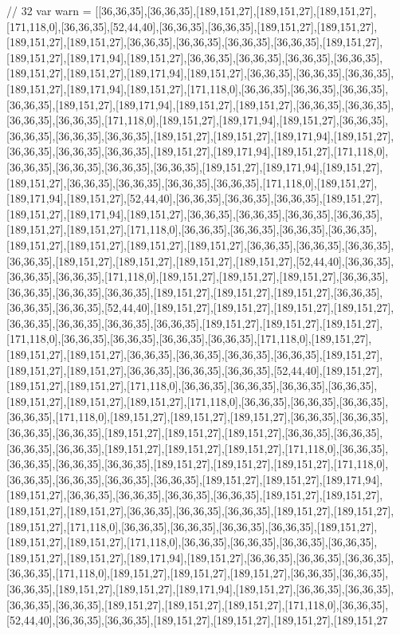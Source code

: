 // 32
var warn = [[36,36,35],[36,36,35],[189,151,27],[189,151,27],[189,151,27],[171,118,0],[36,36,35],[52,44,40],[36,36,35],[36,36,35],[189,151,27],[189,151,27],[189,151,27],[189,151,27],[36,36,35],[36,36,35],[36,36,35],[36,36,35],[189,151,27],[189,151,27],[189,171,94],[189,151,27],[36,36,35],[36,36,35],[36,36,35],[36,36,35],[189,151,27],[189,151,27],[189,171,94],[189,151,27],[36,36,35],[36,36,35],[36,36,35],[189,151,27],[189,171,94],[189,151,27],[171,118,0],[36,36,35],[36,36,35],[36,36,35],[36,36,35],[189,151,27],[189,171,94],[189,151,27],[189,151,27],[36,36,35],[36,36,35],[36,36,35],[36,36,35],[171,118,0],[189,151,27],[189,171,94],[189,151,27],[36,36,35],[36,36,35],[36,36,35],[36,36,35],[189,151,27],[189,151,27],[189,171,94],[189,151,27],[36,36,35],[36,36,35],[36,36,35],[189,151,27],[189,171,94],[189,151,27],[171,118,0],[36,36,35],[36,36,35],[36,36,35],[36,36,35],[189,151,27],[189,171,94],[189,151,27],[189,151,27],[36,36,35],[36,36,35],[36,36,35],[36,36,35],[171,118,0],[189,151,27],[189,171,94],[189,151,27],[52,44,40],[36,36,35],[36,36,35],[36,36,35],[189,151,27],[189,151,27],[189,171,94],[189,151,27],[36,36,35],[36,36,35],[36,36,35],[36,36,35],[189,151,27],[189,151,27],[171,118,0],[36,36,35],[36,36,35],[36,36,35],[36,36,35],[189,151,27],[189,151,27],[189,151,27],[189,151,27],[36,36,35],[36,36,35],[36,36,35],[36,36,35],[189,151,27],[189,151,27],[189,151,27],[189,151,27],[52,44,40],[36,36,35],[36,36,35],[36,36,35],[171,118,0],[189,151,27],[189,151,27],[189,151,27],[36,36,35],[36,36,35],[36,36,35],[36,36,35],[189,151,27],[189,151,27],[189,151,27],[36,36,35],[36,36,35],[36,36,35],[52,44,40],[189,151,27],[189,151,27],[189,151,27],[189,151,27],[36,36,35],[36,36,35],[36,36,35],[36,36,35],[189,151,27],[189,151,27],[189,151,27],[171,118,0],[36,36,35],[36,36,35],[36,36,35],[36,36,35],[171,118,0],[189,151,27],[189,151,27],[189,151,27],[36,36,35],[36,36,35],[36,36,35],[36,36,35],[189,151,27],[189,151,27],[189,151,27],[36,36,35],[36,36,35],[36,36,35],[52,44,40],[189,151,27],[189,151,27],[189,151,27],[171,118,0],[36,36,35],[36,36,35],[36,36,35],[36,36,35],[189,151,27],[189,151,27],[189,151,27],[171,118,0],[36,36,35],[36,36,35],[36,36,35],[36,36,35],[171,118,0],[189,151,27],[189,151,27],[189,151,27],[36,36,35],[36,36,35],[36,36,35],[36,36,35],[189,151,27],[189,151,27],[189,151,27],[36,36,35],[36,36,35],[36,36,35],[36,36,35],[189,151,27],[189,151,27],[189,151,27],[171,118,0],[36,36,35],[36,36,35],[36,36,35],[36,36,35],[189,151,27],[189,151,27],[189,151,27],[171,118,0],[36,36,35],[36,36,35],[36,36,35],[36,36,35],[189,151,27],[189,151,27],[189,171,94],[189,151,27],[36,36,35],[36,36,35],[36,36,35],[36,36,35],[189,151,27],[189,151,27],[189,151,27],[189,151,27],[36,36,35],[36,36,35],[36,36,35],[189,151,27],[189,151,27],[189,151,27],[171,118,0],[36,36,35],[36,36,35],[36,36,35],[36,36,35],[189,151,27],[189,151,27],[189,151,27],[171,118,0],[36,36,35],[36,36,35],[36,36,35],[36,36,35],[189,151,27],[189,151,27],[189,171,94],[189,151,27],[36,36,35],[36,36,35],[36,36,35],[36,36,35],[171,118,0],[189,151,27],[189,151,27],[189,151,27],[36,36,35],[36,36,35],[36,36,35],[189,151,27],[189,151,27],[189,171,94],[189,151,27],[36,36,35],[36,36,35],[36,36,35],[36,36,35],[189,151,27],[189,151,27],[189,151,27],[171,118,0],[36,36,35],[52,44,40],[36,36,35],[36,36,35],[189,151,27],[189,151,27],[189,151,27],[189,151,27
